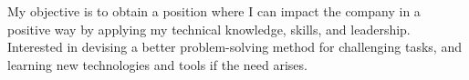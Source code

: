 

\begin{cvparagraph}

My objective is to obtain a position where I can impact the company in a positive way by applying my technical knowledge, skills, and leadership. Interested in devising a better problem-solving method for challenging tasks, and learning new technologies and tools if the need arises.
\end{cvparagraph}
